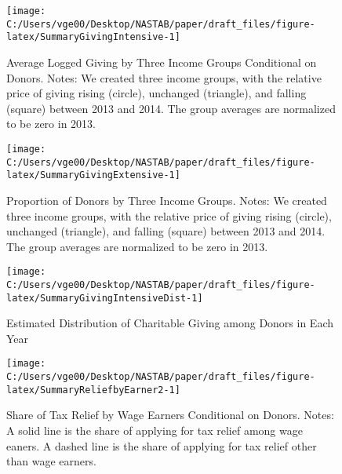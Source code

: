 \documentclass[
  11pt,
  a4paper,
]{article}
\begin{document}
\begin{figure}[H]

{\centering \texttt{[image: C:/Users/vge00/Desktop/NASTAB/paper/draft\_files/figure-latex/SummaryGivingIntensive-1]} 

}

\caption{Average Logged Giving by Three Income Groups Conditional on Donors. Notes: We created three income groups, with the relative price of giving rising (circle), unchanged (triangle), and falling (square) between 2013 and 2014. The group averages are normalized to be zero in 2013.}\label{fig:SummaryGivingIntensive}
\end{figure}

\begin{figure}[t]

{\centering \texttt{[image: C:/Users/vge00/Desktop/NASTAB/paper/draft\_files/figure-latex/SummaryGivingExtensive-1]} 

}

\caption{Proportion of Donors by Three Income Groups. Notes: We created three income groups, with the relative price of giving rising (circle), unchanged (triangle), and falling (square) between 2013 and 2014. The group averages are normalized to be zero in 2013.}\label{fig:SummaryGivingExtensive}
\end{figure}

\begin{figure}[t]

{\centering \texttt{[image: C:/Users/vge00/Desktop/NASTAB/paper/draft\_files/figure-latex/SummaryGivingIntensiveDist-1]} 

}

\caption{Estimated Distribution of Charitable Giving among Donors in Each Year}\label{fig:SummaryGivingIntensiveDist}
\end{figure}

\begin{figure}[t]

{\centering \texttt{[image: C:/Users/vge00/Desktop/NASTAB/paper/draft\_files/figure-latex/SummaryReliefbyEarner2-1]} 

}

\caption{Share of Tax Relief by Wage Earners Conditional on Donors. Notes: A solid line is the share of applying for tax relief among wage eaners. A dashed line is the share of applying for tax relief other than wage earners.}\label{fig:SummaryReliefbyEarner2}
\end{figure}

\newpage
\end{document}
